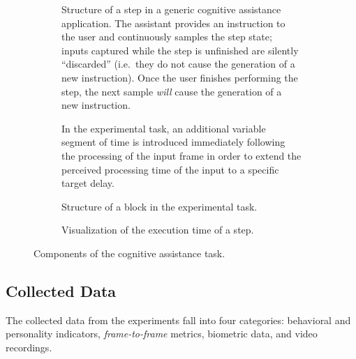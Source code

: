 \documentclass[10pt,letterpaper]{article}
\begin{document}
\begin{figure}[h]
  \centering
  \begin{subfigure}[t]{.49\textwidth}
    \centering
    \caption{Structure of a step in a generic cognitive assistance application. 
    The assistant provides an instruction to the user and continuously samples the step state; inputs captured while the step is unfinished are silently ``discarded'' (i.e.\ they do not cause the generation of a new instruction).
    Once the user finishes performing the step, the next sample \emph{will} cause the generation of a new instruction.
    }
    \label{fig:cogassist:step}
  \end{subfigure}%
  \hfill%
  \begin{subfigure}[t]{.49\textwidth}
    \centering
    \caption{In the experimental task, an additional variable segment of time is introduced immediately following the processing of the input frame in order to extend the perceived processing time of the input to a specific target delay.}%
    \label{fig:cogassist:step:delay}
  \end{subfigure}
  \medskip%
  \begin{subfigure}[t]{.49\textwidth}
    \centering
    \caption{Structure of a block in the experimental task.}%
    \label{fig:cogassist:block}
  \end{subfigure}%
  \hfill%
  \begin{subfigure}[t]{.49\textwidth}
    \centering
    \caption{Visualization of the execution time of a step.}%
    \label{fig:exectime:diagram}
  \end{subfigure}%
  \caption{Components of the cognitive assistance task.}
\end{figure}

\subsection{Collected Data}

The collected data from the experiments fall into four categories: behavioral and personality indicators, \emph{frame-to-frame} metrics, biometric data, and video recordings.
\end{document}
